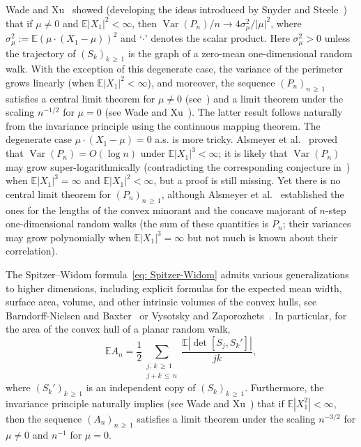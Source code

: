 \documentclass[AHL,Unicode,published]{cedram}
\newcommand{\E}{\mathbb{E}}
\newcommand{\Var}{\mathop{\mathrm{Var}}\nolimits}
\begin{document}
Wade and Xu~\cite{WadeXu} showed (developing the ideas introduced by Snyder and Steele~\cite{SnyderSteele}) that if $\mu \neq 0$ and $\E|X_1|^2<\infty$, then $\Var(P_n)/n \to 4 \sigma_\mu^2/|\mu|^2$, where $\sigma_\mu^2:=\E(\mu \cdot (X_1 - \mu))^2$ and `$\cdot$' denotes the scalar product. Here $\sigma_\mu^2>0$ unless the trajectory of $(S_k)_{k\,\ge\,1}$ is the graph of a zero-mean one-dimensional random walk. With the exception of this degenerate case, the variance of the perimeter grows linearly (when $\E|X_1|^2<\infty$), and moreover, the sequence $(P_n)_{n\,\ge\,1}$ satisfies a central limit theorem for $\mu \neq 0$ (see~\cite{WadeXu}) and a limit theorem under the scaling $n^{-1/2}$ for $\mu = 0$ (see Wade and Xu~\cite{WadeXu2}). The latter result follows naturally from the invariance principle using the continuous mapping theorem. The degenerate case $\mu \cdot (X_1 - \mu) =0$ a.s. is more tricky. Alsmeyer et al.~\cite{AKMV} proved that $\Var(P_n) =O(\log n)$ under $\E |X_1|^3<\infty$; it is likely that $\Var(P_n)$ may grow super-logarithmically (contradicting the corresponding conjecture in~\cite{WadeXu}) when $\E |X_1|^3=\infty$ and $\E |X_1|^2<\infty$, but a proof is still missing. Yet there is no central limit theorem for $(P_n)_{n\,\ge\,1}$, although Alsmeyer et al.~\cite{AKMV} established the ones for the lengths of the convex minorant and the concave majorant of $n$-step one-dimensional random walks (the sum of these quantities is $P_n$; their variances may grow polynomially when $\E |X_1|^3=\infty$ but not much is known about their correlation).

The Spitzer--Widom formula~\eqref{eq: Spitzer-Widom} admits various generalizations to higher dimensions, including explicit formulas for the expected mean width, surface area, volume, and other intrinsic volumes of the convex hulls, see Barndorff-Nielsen and Baxter~\cite{BNielsen} or Vysotsky and Zaporozhets~\cite{VysotskyZaporozhets}. In particular, for the area of the convex hull of a planar random walk,
\begin{equation}\label{eq: E area}
\E A_n = \frac12 \sum_{\substack{j,\,k\,\ge\,1 \\
j + k\,\le\,n }} \frac{\E|\det[S_j, S_k'] |}{jk},
\end{equation}
where $(S_k')_{k\,\ge\,1}$ is an independent copy of $(S_k)_{k\,\ge\,1}$. Furthermore, the invariance principle naturally implies (see Wade and Xu~\cite{WadeXu2}) that if $\E |X_1^2| <\infty$, then the sequence $(A_n)_{n\,\ge\,1}$ satisfies a limit theorem under the scaling $n^{-3/2}$ for $\mu \neq 0$ and $n^{-1}$ for $\mu=0$.
\end{document}
